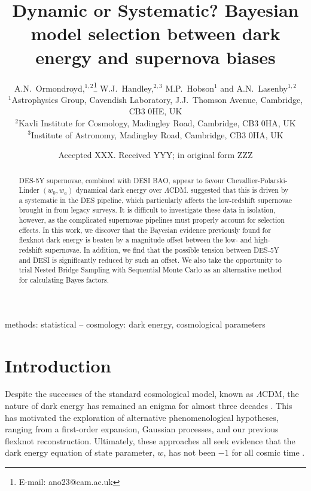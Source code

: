 \documentclass[fleqn,usenatbib]{mnras}
\title[Dynamic or Systematic?]{Dynamic or Systematic? Bayesian model selection between dark energy and supernova biases}
\author[A.N.~Ormondroyd et al.]{
    A.N.~Ormondroyd,$^{1,2}$\thanks{E-mail: ano23@cam.ac.uk}
    W.J.~Handley,$^{2,3}$
    M.P.~Hobson$^{1}$
    and A.N.~Lasenby$^{1,2}$
    \\
    $^{1}$Astrophysics Group, Cavendish Laboratory, J.J.~Thomson Avenue, Cambridge, CB3 0HE, UK\\
    $^{2}$Kavli Institute for Cosmology, Madingley Road, Cambridge, CB3 0HA, UK\\
    $^{3}$Institute of Astronomy, Madingley Road, Cambridge, CB3 0HA, UK\\
    }
\date{Accepted XXX. Received YYY; in original form ZZZ}
\newcommand{\lcdm}{$\Lambda$CDM}
\begin{document}
    \label{firstpage}
    \pagerange{\pageref{firstpage}--\pageref{lastpage}}
    \maketitle

    \begin{abstract}
        DES-5Y supernovae, combined with DESI BAO, appear to favour Chevallier-Polarski-Linder $(w_0, w_a)$ dynamical dark energy over \lcdm{}.
        \citet{georgedes5y} suggested that this is driven by a systematic in the DES pipeline, which particularly affects the low-redshift supernovae brought in from legacy surveys.
        It is difficult to investigate these data in isolation, however, as the complicated supernovae pipelines must properly account for selection effects.
        In this work, we discover that the Bayesian evidence previously found for flexknot dark energy \citep{paper2} is beaten by a magnitude offset between the low- and high-redshift supernovae.
        In addition, we find that the possible tension between DES-5Y and DESI is significantly reduced by such an offset.
        We also take the opportunity to trial Nested Bridge Sampling with Sequential Monte Carlo as an alternative method for calculating Bayes factors.
    \end{abstract}

    \begin{keywords}
        methods: statistical -- cosmology: dark energy, cosmological parameters
    \end{keywords}



    \section{Introduction}

    Despite the successes of the standard cosmological model, known as \lcdm{}, the nature of dark energy has remained an enigma for almost three decades \citep{SupernovaSearchTeam:1998, SupernovaCosmologyProject:1998}.
    This has motivated the exploration of alternative phenomenological hypotheses, ranging from a first-order expansion, Gaussian processes, and our previous flexknot reconstruction. Ultimately, these approaches all seek evidence that the dark energy equation of state parameter, $w$, has not been $-1$ for all cosmic time \citep{einstein1917, einstein1917centenary}.
\end{document}

